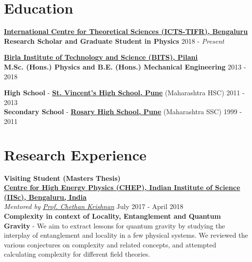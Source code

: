 \documentclass[margin, centered]{res}
\begin{document}
\begin{resume}


\section{Education}
\textbf{\href{https://www.icts.res.in/}{International Centre for Theoretical Sciences (ICTS-TIFR), Bengaluru}}\\
\textbf{Research Scholar and Graduate Student in Physics} \hfill 2018 - \textit{Present}

\textbf{\href{http://www.bits-pilani.ac.in/}{Birla Institute of Technology and Science (BITS), Pilani}}\\
\textbf{M.Sc. (Hons.) Physics and B.E. (Hons.) Mechanical Engineering} \hfill 2013 - 2018

\textbf{High School} - \textbf{\href{http://www.stvincentspune.com/}{St. Vincent's High School, Pune}} (Maharashtra HSC) \hfill 2011 - 2013 \\
\textbf{Secondary School} - \textbf{\href{http://www.rosaryedu.org}{Rosary High School, Pune}} (Maharashtra SSC) \hfill 1999 - 2011

\section{Research Experience}

\textbf{Visiting Student (Masters Thesis)}
\\
\textbf{\href{http://chep.iisc.ac.in/}{Centre for High Energy Physics (CHEP), Indian Institute of Science (IISc), Bengaluru, India}}\\
\emph{Mentored by \href{http://chep.iisc.ac.in/Personnel/pages/chethan/index.html}{Prof. Chethan Krishnan}} \hfill July 2017 - April 2018\\
\textbf{Complexity in context of Locality, Entanglement and Quantum Gravity} - We aim to extract lessons for quantum gravity by studying the interplay of entanglement and locality in a few physical systems. We reviewed the various conjectures on complexity and related concepts, and attempted calculating complexity for different field theories.


\end{resume}
\end{document}
